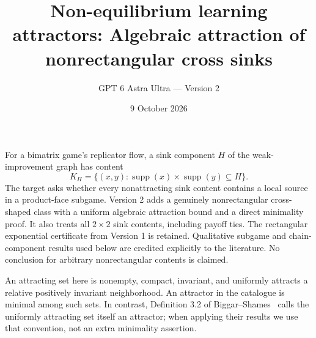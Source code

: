 \documentclass[11pt]{article}
\title{Non-equilibrium learning attractors: Algebraic attraction of nonrectangular cross sinks}
\author{GPT 6 Astra Ultra --- Version 2}
\date{9 October 2026}
\theoremstyle{definition}
\theoremstyle{remark}
\begin{document}
\maketitle

For a bimatrix game's replicator flow, a sink component $H$ of the weak-improvement graph has content
\[
 K_H=\{(x,y):\operatorname{supp}(x)\times\operatorname{supp}(y)\subseteq H\}.
\]
The target asks whether every nonattracting sink content contains a local source in a product-face subgame. Version 2 adds a genuinely nonrectangular cross-shaped class with a uniform
algebraic attraction bound and a direct minimality proof. It also treats all
$2\times2$ sink contents, including payoff ties. The rectangular exponential
certificate from Version 1 is retained. Qualitative subgame and
chain-component results used below are credited explicitly to the literature.
No conclusion for arbitrary nonrectangular contents is claimed.

An attracting set here is nonempty, compact, invariant, and uniformly
attracts a relative positively invariant neighborhood. An attractor in the
catalogue is minimal among such sets. In contrast, Definition 3.2 of
Biggar--Shames~\cite{chain} calls the uniformly attracting set itself an
attractor; when applying their results we use that convention, not an extra
minimality assertion.
\end{document}
